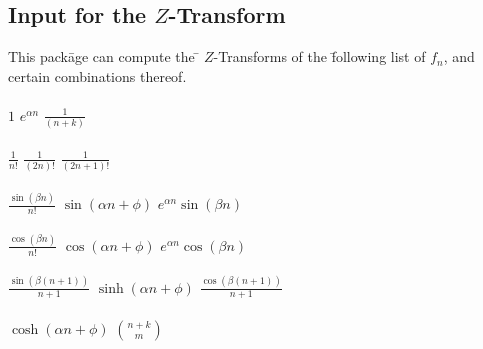 \subsection[Input for the Z-Transform]{Input for the $Z$-Transform}
\begin{tabbing}
  This pack\=age can compute the \= $Z$-Transforms of the \=following 
  list of $f_n$, and \\ certain combinations thereof.\\ \\

\>$1$                             
\>$e^{\alpha n}$                  
\>$\frac{1}{(n+k)}$               \\ \\
\>$\frac{1}{n!}$                  
\>$\frac{1}{(2n)!}$               
\>$\frac{1}{(2n+1)!}$             \\ \\
\>$\frac{\sin(\beta n)}{n!}$      
\>$\sin(\alpha n+\phi)$           
\>$e^{\alpha n} \sin(\beta n)$    \\ \\
\>$\frac{\cos(\beta n)}{n!}$      
\>$\cos(\alpha n+\phi)$           
\>$e^{\alpha n} \cos(\beta n)$    \\ \\
\>$\frac{\sin(\beta (n+1))}{n+1}$ 
\>$\sinh(\alpha n+\phi)$          
\>$\frac{\cos(\beta (n+1))}{n+1}$ \\ \\
\>$\cosh(\alpha n+\phi)$          
\>$\binom{n+k}{m}$\\
\end{tabbing}

